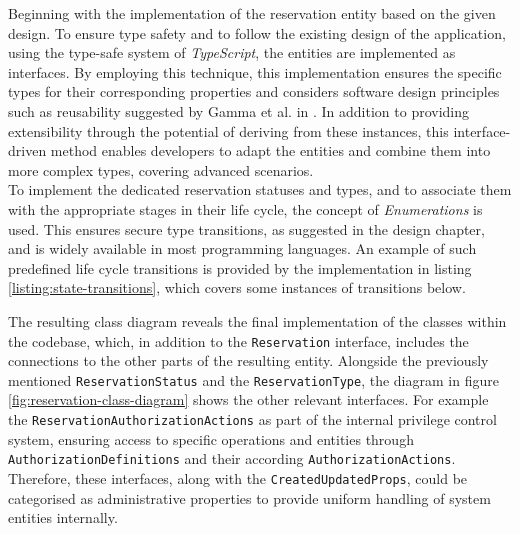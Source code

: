 Beginning with the implementation of the reservation entity based on the given design.
To ensure type safety and to follow the existing design of the application, using the type-safe system of \textit{TypeScript}, the entities are implemented as interfaces.
By employing this technique, this implementation ensures the specific types for their corresponding properties and considers software design principles such as reusability suggested by Gamma et al. in \cite[p.~47ff]{gamma_design_2015}. 
In addition to providing extensibility through the potential of deriving from these instances, this interface-driven method enables developers to adapt the entities and combine them into more complex types, covering advanced scenarios. \\
\noindent To implement the dedicated reservation statuses and types, and to associate them with the appropriate stages in their life cycle, the concept of \textit{Enumerations} is used. This ensures secure type transitions, as suggested in the design chapter, and is widely available in most programming languages.
An example of such predefined life cycle transitions is provided by the implementation in listing \ref{listing:state-transitions}, which covers some instances of transitions below. 



\noindent The resulting class diagram reveals the final implementation of the classes within the codebase, which, in addition to the \texttt{Reservation} interface, includes the connections to the other parts of the resulting entity.
Alongside the previously mentioned \texttt{ReservationStatus} and the \texttt{ReservationType}, the diagram in figure \ref{fig:reservation-class-diagram} shows the other relevant interfaces. 
For example the \texttt{ReservationAuthorizationActions} as part of the internal privilege control system, ensuring access to specific operations and entities through \texttt{AuthorizationDefinitions} and their according \texttt{AuthorizationActions}.
Therefore, these interfaces, along with the \texttt{CreatedUpdatedProps}, could be categorised as administrative properties to provide uniform handling of system entities internally.

